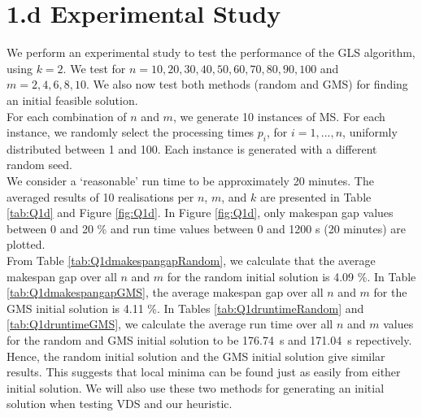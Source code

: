 \documentclass[12pt,a4paper,reqno]{article}
\begin{document}
\section*{1.d Experimental Study} \label{sec:GLSexp}
We perform an experimental study to test the performance of the GLS algorithm, using $k=2$. We test for $n=10,20,30,40,50,60,70,80,90,100$ and $m=2,4,6,8,10$. We also now test both methods (random and GMS) for finding an initial feasible solution. \\

For each combination of $n$ and $m$, we generate 10 instances of MS. For each instance, we randomly select the processing times $p_i$, for $i=1,...,n$, uniformly distributed between 1 and 100. Each instance is generated with a different random seed. \\

We consider a `reasonable' run time to be approximately 20 minutes. The averaged results of 10 realisations per $n$, $m$, and $k$ are presented in Table \ref{tab:Q1d} and Figure \ref{fig:Q1d}. In Figure \ref{fig:Q1d}, only makespan gap values between 0 and 20 \% and run time values between 0 and 1200 s (20 minutes) are plotted. \\

From Table \ref{tab:Q1dmakespangapRandom}, we calculate that the average makespan gap over all $n$ and $m$ for the random initial solution is 4.09 \%. In Table \ref{tab:Q1dmakespangapGMS}, the average makespan gap over all $n$ and $m$ for the GMS initial solution is 4.11 \%. In Tables  \ref{tab:Q1druntimeRandom} and \ref{tab:Q1druntimeGMS}, we calculate the average run time over all $n$ and $m$ values for the random and GMS initial solution to be 176.74~s and 171.04~s repectively. Hence, the random initial solution and the GMS initial solution give similar results. This suggests that local minima can be found just as easily from either initial solution. We will also use these two methods for generating an initial solution when testing VDS and our heuristic.
\end{document}
